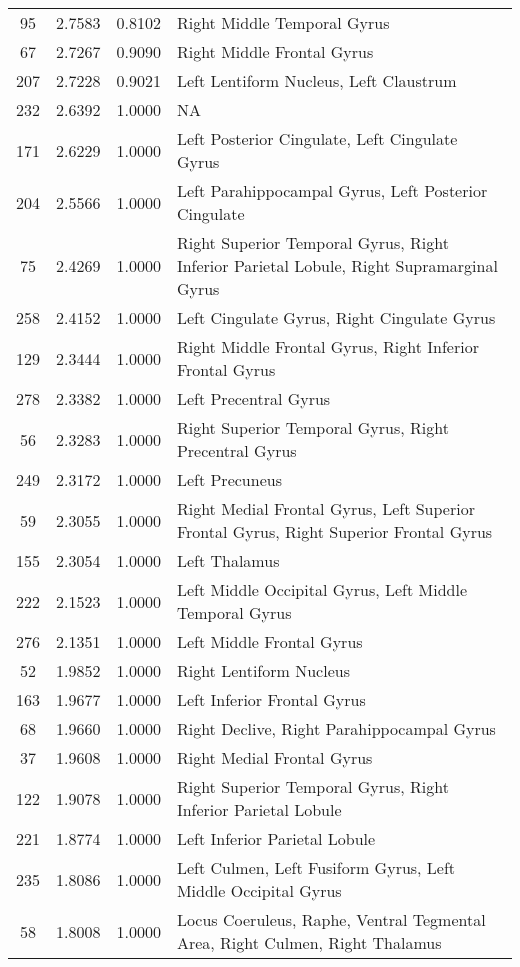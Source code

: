 \documentclass[10pt,letterpaper]{article}\usepackage[]{graphicx}\usepackage[]{color}
\begin{document}
\begin{center}
\begin{longtable}[c]{cccp{4in}}
		95	& 2.7583 & 0.8102 & Right Middle Temporal Gyrus \\
		67	& 2.7267 & 0.9090 & Right Middle Frontal Gyrus \\
		207	& 2.7228 & 0.9021 & Left Lentiform Nucleus, Left Claustrum \\
		232	& 2.6392 & 1.0000 & NA \\
		171	& 2.6229 & 1.0000 & Left Posterior Cingulate, Left Cingulate Gyrus \\
		204	& 2.5566 & 1.0000 & Left Parahippocampal Gyrus, Left Posterior Cingulate \\
		75	& 2.4269 & 1.0000 & Right Superior Temporal Gyrus, Right Inferior Parietal Lobule, Right Supramarginal Gyrus \\
		258	& 2.4152 & 1.0000 & Left Cingulate Gyrus, Right Cingulate Gyrus \\
		129	& 2.3444 & 1.0000 & Right Middle Frontal Gyrus, Right Inferior Frontal Gyrus \\
		278	& 2.3382 & 1.0000 & Left Precentral Gyrus \\
		56	& 2.3283 & 1.0000 & Right Superior Temporal Gyrus, Right Precentral Gyrus \\
		249	& 2.3172 & 1.0000 & Left Precuneus \\
		59	& 2.3055 & 1.0000 & Right Medial Frontal Gyrus, Left Superior Frontal Gyrus, Right Superior Frontal Gyrus\\
		155	& 2.3054 & 1.0000 & Left Thalamus \\
		222	& 2.1523 & 1.0000 & Left Middle Occipital Gyrus, Left Middle Temporal Gyrus \\
		276	& 2.1351 & 1.0000 & Left Middle Frontal Gyrus \\
		52	& 1.9852 & 1.0000 & Right Lentiform Nucleus \\
		163	& 1.9677 & 1.0000 & Left Inferior Frontal Gyrus \\
		68	& 1.9660 & 1.0000 & Right Declive, Right Parahippocampal Gyrus \\
		37	& 1.9608 & 1.0000 & Right Medial Frontal Gyrus \\
		122	& 1.9078 & 1.0000 & Right Superior Temporal Gyrus, Right Inferior Parietal Lobule \\
		221	& 1.8774 & 1.0000 & Left Inferior Parietal Lobule \\
		235	& 1.8086 & 1.0000 & Left Culmen, Left Fusiform Gyrus, Left Middle Occipital Gyrus \\
		58	& 1.8008 & 1.0000 & Locus Coeruleus, Raphe, Ventral Tegmental Area, Right Culmen, Right Thalamus \\

\end{longtable}
\end{center}
\end{document}
